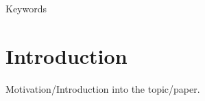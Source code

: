 
Keywords

\section{Introduction}
\label{ch:Introduction}
Motivation/Introduction into the topic/paper.


%
%
%
%
%
%
%


